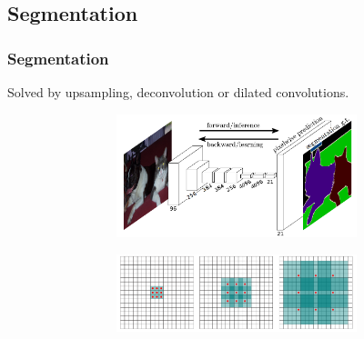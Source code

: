 \documentclass{beamer}
\begin{document}
	\subsection[Segmentation]{Segmentation}
	\begin{frame}
		\frametitle{Segmentation}
		Solved by upsampling, deconvolution or dilated convolutions.
		\begin{figure}[h]
			\centering
			\begin{subfigure}{0.47\textwidth}
				\begin{subfigure}{\textwidth}
					\includegraphics[width=\textwidth]{plots/fcn.png}
				\end{subfigure}
				\par \bigskip
				\begin{subfigure}{\textwidth}
					\includegraphics[width=\textwidth]{plots/dilated.png}
				\end{subfigure}
			\end{subfigure}
			~
			\begin{subfigure}{0.5\textwidth}

\end{subfigure}
\end{figure}
\end{frame}
\end{document}
